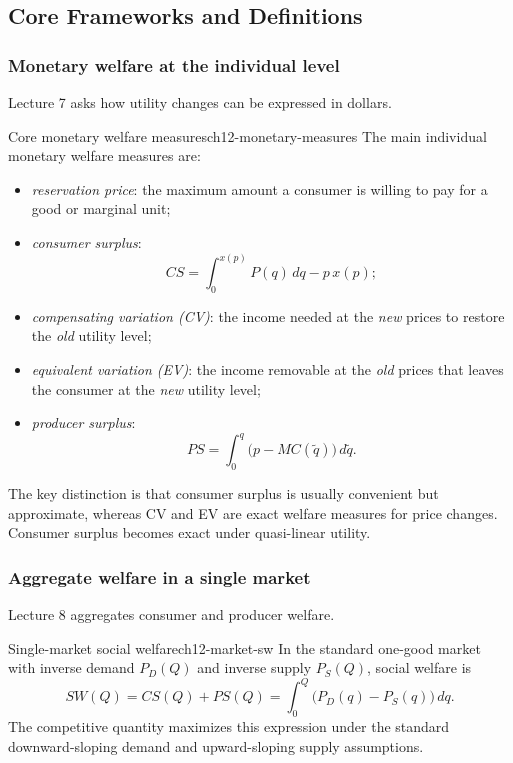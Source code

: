 \subsection{Core Frameworks and Definitions}

\subsubsection{Monetary welfare at the individual level}

Lecture 7 asks how utility changes can be expressed in dollars.

\begin{definition}{Core monetary welfare measures}{ch12-monetary-measures}
The main individual monetary welfare measures are:
\begin{itemize}
    \item \emph{reservation price}: the maximum amount a consumer is willing to pay for a good or marginal unit;
    \item \emph{consumer surplus}:
    \[
    CS=\int_0^{x(p)} P(q)\,dq-p\,x(p);
    \]
    \item \emph{compensating variation (CV)}: the income needed at the \emph{new} prices to restore the \emph{old} utility level;
    \item \emph{equivalent variation (EV)}: the income removable at the \emph{old} prices that leaves the consumer at the \emph{new} utility level;
    \item \emph{producer surplus}:
    \[
    PS=\int_0^q \bigl(p-MC(\tilde q)\bigr)\,d\tilde q.
    \]
\end{itemize}
\end{definition}

The key distinction is that consumer surplus is usually convenient but approximate, whereas CV and EV are exact welfare measures for price changes. Consumer surplus becomes exact under quasi-linear utility.

\subsubsection{Aggregate welfare in a single market}

Lecture 8 aggregates consumer and producer welfare.

\begin{definition}{Single-market social welfare}{ch12-market-sw}
In the standard one-good market with inverse demand \(P_D(Q)\) and inverse supply \(P_S(Q)\), social welfare is
\[
SW(Q)=CS(Q)+PS(Q)=\int_0^Q \bigl(P_D(q)-P_S(q)\bigr)\,dq.
\]
The competitive quantity maximizes this expression under the standard downward-sloping demand and upward-sloping supply assumptions.
\end{definition}

